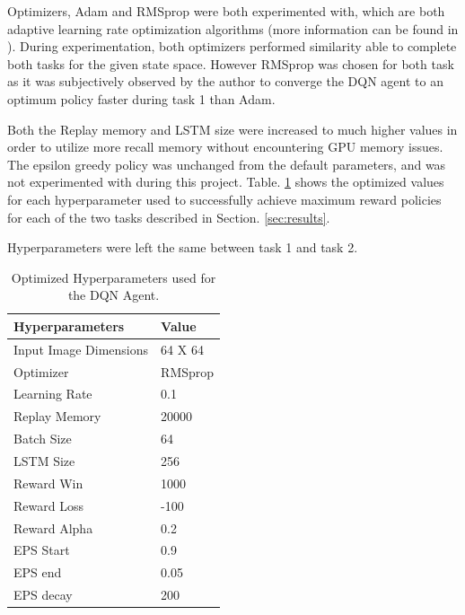 \documentclass[1p, number, sort&compress,table, 11pt]{elsarticle}
\begin{document}
	Optimizers, Adam and RMSprop were both experimented with, which are both adaptive learning rate optimization algorithms (more information can be found in \cite{introOpt}). During experimentation, both optimizers performed similarity able to complete both tasks for the given state space. However RMSprop was chosen for both task as it was subjectively observed by the author to converge the DQN agent to an optimum policy faster during task 1 than Adam.

	Both the Replay memory and LSTM size were increased to much higher values in order to utilize more recall memory without encountering GPU memory issues. The epsilon greedy policy was unchanged from the default parameters, and was not experimented with during this project. Table. \ref{tab:hyperparams} shows the optimized values for each hyperparameter used to successfully achieve maximum reward policies for each of the two tasks described in Section. \ref{sec:results}.

	Hyperparameters were left the same between task 1 and task 2.

	\begin{table}[ht]
		\centering
		\caption{Optimized Hyperparameters used for the DQN Agent.}
		\label{tab:hyperparams}
		\begin{tabular}{ll}
			\toprule%
		\textbf{Hyperparameters} & \textbf{Value} \\
		\midrule
		Input Image Dimensions  & 64 X 64        \\
		Optimizer               & RMSprop        \\
		Learning Rate           & 0.1            \\
		Replay Memory           & 20000          \\
		Batch Size              & 64             \\
		LSTM Size               & 256            \\
		Reward Win              & 1000            \\
		Reward Loss             & -100            \\
		Reward Alpha            & 0.2  			 \\
		EPS Start				& 0.9				\\
		EPS end					& 0.05				\\
		EPS decay				& 200				\\
		\bottomrule%
		\end{tabular}
	\end{table}
	
\end{document}
